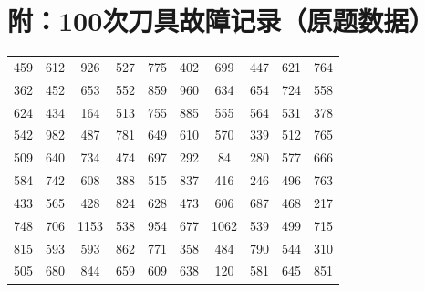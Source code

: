 \documentclass[12pt,a4paper]{ctexart}
\begin{document}
\section*{附：100次刀具故障记录（原题数据）}
{\small
\begin{center}
\begin{tabular}{cccccccccc}
459 & 612 & 926 & 527 & 775 & 402 & 699 & 447 & 621 & 764 \\
362 & 452 & 653 & 552 & 859 & 960 & 634 & 654 & 724 & 558 \\
624 & 434 & 164 & 513 & 755 & 885 & 555 & 564 & 531 & 378 \\
542 & 982 & 487 & 781 & 649 & 610 & 570 & 339 & 512 & 765 \\
509 & 640 & 734 & 474 & 697 & 292 & 84  & 280 & 577 & 666 \\
584 & 742 & 608 & 388 & 515 & 837 & 416 & 246 & 496 & 763 \\
433 & 565 & 428 & 824 & 628 & 473 & 606 & 687 & 468 & 217 \\
748 & 706 & 1153& 538 & 954 & 677 & 1062& 539 & 499 & 715 \\
815 & 593 & 593 & 862 & 771 & 358 & 484 & 790 & 544 & 310 \\
505 & 680 & 844 & 659 & 609 & 638 & 120 & 581 & 645 & 851 \\
\end{tabular}
\end{center}
}
\end{document}
